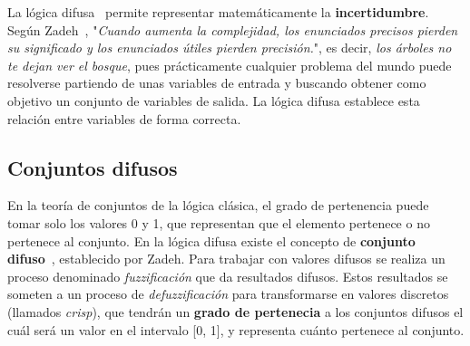 La lógica difusa~\cite{Morc11} permite representar matemáticamente la \textbf{incertidumbre}. Según Zadeh~\cite{Zad73}, "\textit{Cuando aumenta la complejidad, los enunciados precisos pierden su significado y los enunciados útiles pierden precisión.}", es decir, \textit{los árboles no te dejan ver el bosque}, pues prácticamente cualquier problema del mundo puede resolverse partiendo de unas variables de entrada y buscando obtener como objetivo un conjunto de variables de salida. La lógica difusa establece esta relación entre variables de forma correcta.

\subsection{Conjuntos difusos}
En la teoría de conjuntos de la lógica clásica, el grado de pertenencia puede tomar solo los valores 0 y 1, que representan que el elemento pertenece o no pertenece al conjunto. En la lógica difusa existe el concepto de \textbf{conjunto difuso}~\cite{Zad65}, establecido por Zadeh. Para trabajar con valores difusos se realiza un proceso denominado \textit{fuzzificación} que da resultados difusos. Estos resultados se someten a un proceso de \textit{defuzzificación} para transformarse en valores discretos (llamados \textit{crisp}), que tendrán un \textbf{grado de pertenecia} a los conjuntos difusos el cuál será un valor en el intervalo [0, 1], y representa cuánto pertenece al conjunto.\\

